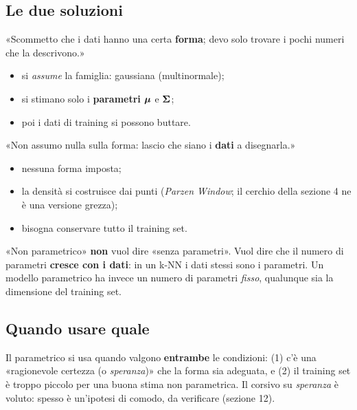 \subsection{Le due soluzioni}
\begin{tcbraster}[raster columns=2,raster equal height,raster column skip=10pt]
\begin{tcolorbox}[base,colback=blu!6,colbacktitle=blu,coltitle=white,borderline west={3pt}{0pt}{blu},title={Parametrico},top=13pt,unbreakable]
«Scommetto che i dati hanno una certa \textbf{forma}; devo solo trovare i pochi numeri che la descrivono.»
\begin{itemize}
  \item si \emph{assume} la famiglia: gaussiana (multinormale);
  \item si stimano solo i \textbf{parametri} $\bm{\mu}$ e $\bm{\Sigma}$;
  \item poi i dati di training si possono buttare.
\end{itemize}
\end{tcolorbox}
\begin{tcolorbox}[base,colback=ambra!7,colbacktitle=ambra,coltitle=white,borderline west={3pt}{0pt}{ambra},title={Non parametrico},top=13pt,unbreakable]
«Non assumo nulla sulla forma: lascio che siano i \textbf{dati} a disegnarla.»
\begin{itemize}
  \item nessuna forma imposta;
  \item la densità si costruisce dai punti (\emph{Parzen Window}; il cerchio della sezione 4 ne è una versione grezza);
  \item bisogna conservare tutto il training set.
\end{itemize}
\end{tcolorbox}
\end{tcbraster}

\begin{attenzione}
«Non parametrico» \textbf{non} vuol dire «senza parametri». Vuol dire che il numero di parametri \textbf{cresce con i dati}: in un k-NN i dati stessi sono i parametri. Un modello parametrico ha invece un numero di parametri \emph{fisso}, qualunque sia la dimensione del training set.
\end{attenzione}

\subsection{Quando usare quale}
Il parametrico si usa quando valgono \textbf{entrambe} le condizioni: (1) c'è una «ragionevole certezza (o \emph{speranza})» che la forma sia adeguata, e (2) il training set è troppo piccolo per una buona stima non parametrica. Il corsivo su \emph{speranza} è voluto: spesso è un'ipotesi di comodo, da verificare (sezione 12).

